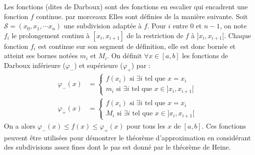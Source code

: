 \begin{exple}
 Les fonctions (dites de Darboux) sont des fonctions en escalier qui encadrent une fonction $f$ continue. par morceaux  Elles sont définies de la manière suivante.\newline
 Soit $\mathcal S =(x_0,x_1,\cdots x_n)$ une subdivision adaptée à $f$. Pour $i$ entre $0$ et $n-1$, on note $f_i$ le prolongement continu à $[x_i,x_{i+1}]$ de la restriction de $f$ à $]x_i,x_{i+1}[$. Chaque fonction $f_i$ est continue sur son segment de définition, elle est donc bornée et atteint ses bornes notées $m_i$ et $M_i$.\newline
On définit $\forall x\in[a,b]$ les fonctions de Darboux inférieure ($\varphi_-$) et supérieure ($\varphi_+$) par : 
\begin{align*}
\varphi_{-}(x) &= 
\begin{cases}
f(x_i) \text{ si } \exists i \text{ tel que } x=x_i\\
m_i \text{ si } \exists i \text{ tel que } x\in ]x_i,x_{i+1}[
\end{cases}\\
\varphi_{+}(x) &= 
\begin{cases}
f(x_i) \text{ si } \exists i \text{ tel que } x=x_i\\
M_i \text{ si } \exists i \text{ tel que } x\in ]x_i,x_{i+1}[
\end{cases}
\end{align*}
On a alors $\varphi_{-}(x)\leq f(x) \leq \varphi_{+}(x)$ pour tous les $x$ de $[a,b]$. Ces fonctions peuvent être utilisées pour démontrer le théorème d'approximation en considérant des subdivisions assez fines dont le pas est donné par le théorème de Heine.
\end{exple}

